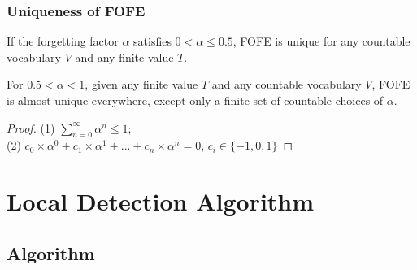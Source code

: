 \documentclass{beamer}
\begin{document}
\begin{frame}
\frametitle{Uniqueness of FOFE}
\begin{theorem}
	If the forgetting factor $\alpha$ satisfies $0 < \alpha \leq 0.5$, 
	FOFE is unique for any countable vocabulary $V$ and any finite value $T$.
\end{theorem}
\begin{theorem}
	For $0.5 < \alpha < 1 $, given any finite value $T$ and any countable vocabulary $V$,
	FOFE is almost unique everywhere, except only a finite set of countable choices of $\alpha$.
\end{theorem}
\begin{proof}
	(1) $\sum\limits_{n=0}^{\infty} \alpha^n \le 1$; \\
	(2) $c_0 \times \alpha^0 + c_1 \times \alpha^1 + ... + c_n \times \alpha^n = 0$, $c_i \in \{-1, 0, 1\}$
\end{proof}
\end{frame}



\section{Local Detection Algorithm}

\subsection{Algorithm}
\end{document}
